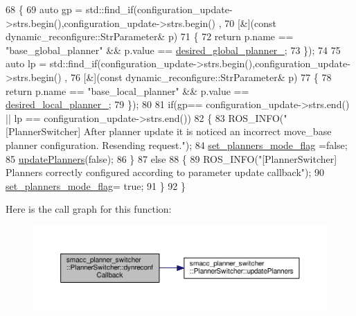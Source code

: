 \begin{DoxyCode}
68 \{
69   \textcolor{keyword}{auto} gp = std::find\_if(configuration\_update->strs.begin(),configuration\_update->strs.begin() ,
70               [&](\textcolor{keyword}{const} dynamic\_reconfigure::StrParameter& p)
71               \{
72                   \textcolor{keywordflow}{return} p.name == \textcolor{stringliteral}{"base\_global\_planner"} &&  p.value == 
      \hyperlink{classsmacc__planner__switcher_1_1PlannerSwitcher_aed229df648a0903e3cdf77682220efb5}{desired\_global\_planner\_};
73               \});
74 
75   \textcolor{keyword}{auto} lp = std::find\_if(configuration\_update->strs.begin(),configuration\_update->strs.begin() ,
76               [&](\textcolor{keyword}{const} dynamic\_reconfigure::StrParameter& p)
77               \{
78                 \textcolor{keywordflow}{return} p.name == \textcolor{stringliteral}{"base\_local\_planner"} &&  p.value == 
      \hyperlink{classsmacc__planner__switcher_1_1PlannerSwitcher_aecc5958653ed39dd7611783043d23345}{desired\_local\_planner\_};
79               \});
80 
81   \textcolor{keywordflow}{if}(gp== configuration\_update->strs.end() ||  lp == configuration\_update->strs.end())
82     \{
83       ROS\_INFO(\textcolor{stringliteral}{"[PlannerSwitcher] After planner update it is noticed an incorrect move\_base planner
       configuration. Resending request."});
84       \hyperlink{classsmacc__planner__switcher_1_1PlannerSwitcher_a266b7a17a8c92bda2d74a7c8991a4a61}{set\_planners\_mode\_flag} =\textcolor{keyword}{false};
85       \hyperlink{classsmacc__planner__switcher_1_1PlannerSwitcher_ae45c57b459f1eb9ee4cc3c6dc6dc0995}{updatePlanners}(\textcolor{keyword}{false});
86     \}
87     \textcolor{keywordflow}{else}
88     \{
89       ROS\_INFO(\textcolor{stringliteral}{"[PlannerSwitcher] Planners correctly configured according to parameter update callback"});
90       \hyperlink{classsmacc__planner__switcher_1_1PlannerSwitcher_a266b7a17a8c92bda2d74a7c8991a4a61}{set\_planners\_mode\_flag}= \textcolor{keyword}{true};
91     \}
92 \}
\end{DoxyCode}


Here is the call graph for this function\+:
\nopagebreak
\begin{figure}[H]
\begin{center}
\leavevmode
\includegraphics[width=350pt]{classsmacc__planner__switcher_1_1PlannerSwitcher_a19328a8a844797e39dd24736872bd442_cgraph}
\end{center}
\end{figure}




